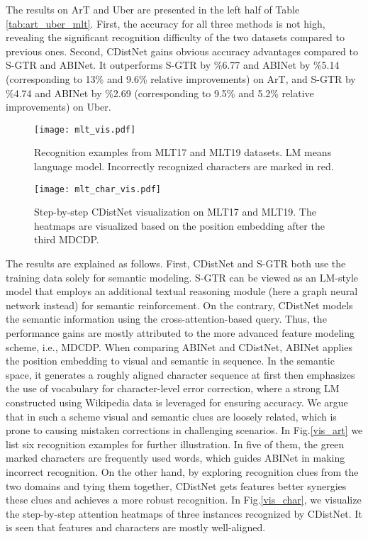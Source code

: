 The results on ArT and Uber are presented in the left half of Table \ref{tab:art_uber_mlt}. First, the accuracy for all three methods is not high, revealing the significant recognition difficulty of the two datasets compared to previous ones. Second, CDistNet gains obvious accuracy advantages compared to S-GTR and ABINet. It outperforms S-GTR by \%6.77 and ABINet by \%5.14 (corresponding to 13\% and 9.6\% relative improvements) on ArT, and S-GTR by \%4.74 and ABINet by \%2.69 (corresponding to 9.5\% and 5.2\% relative improvements) on Uber. 

\begin{figure*}[]
\centering
\texttt{[image: mlt\_vis.pdf]} \caption{Recognition examples from MLT17 and MLT19 datasets. LM means language model. Incorrectly recognized characters are marked in red.}
\label{vis_MLT}
\end{figure*}

\begin{figure*}[]
\centering
\texttt{[image: mlt\_char\_vis.pdf]} \caption{Step-by-step CDistNet visualization on MLT17 and MLT19. The heatmaps are visualized based on the position embedding after the third MDCDP.}
\label{vis_MLT_char}
\end{figure*}

The results are explained as follows. First, CDistNet and S-GTR both use the training data solely for semantic modeling. S-GTR can be viewed as an LM-style model that employs an additional textual reasoning module (here a graph neural network instead) for semantic reinforcement. On the contrary, CDistNet models the semantic information using the cross-attention-based query. Thus, the performance gains are mostly attributed to the more advanced feature modeling scheme, i.e., MDCDP. When comparing ABINet and CDistNet, ABINet applies the position embedding to visual and semantic in sequence. In the semantic space, it generates a roughly aligned character sequence at first then emphasizes the use of vocabulary for character-level error correction, where a strong LM constructed using Wikipedia data is leveraged for ensuring accuracy. We argue that in such a scheme visual and semantic clues are loosely related, which is prone to causing mistaken corrections in challenging scenarios. In Fig.\ref{vis_art} we list six recognition examples for further illustration. In five of them, the green marked characters are frequently used words, which guides ABINet in making incorrect recognition. On the other hand, by exploring recognition clues from the two domains and tying them together, CDistNet gets features better synergies these clues and achieves a more robust recognition. In Fig.\ref{vis_char}, we visualize the step-by-step attention heatmaps of three instances recognized by CDistNet. It is seen that features and characters are mostly well-aligned. 


